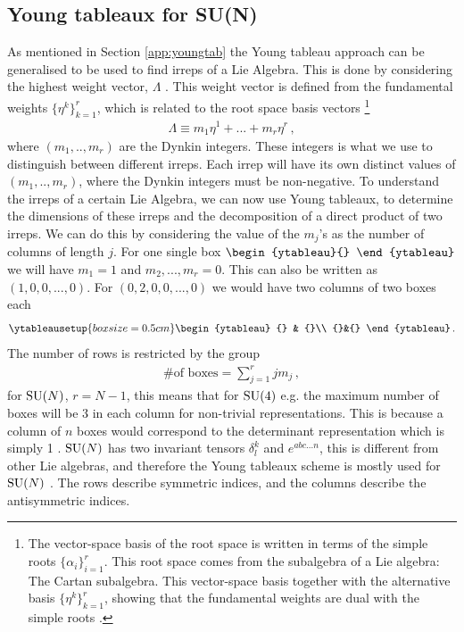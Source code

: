 \subsection{Young tableaux for SU(N)} \label{app:youngtabSUN}
As mentioned in Section \ref{app:youngtab} the Young tableau approach can be generalised to be used to find irreps of a Lie Algebra. This is done by considering the highest weight vector, $\Lambda$ \cite{Georgi:1999wka}. This weight vector is defined from the fundamental weights $\{\eta^k\}^r_{k=1}$, which is related to the root space basis vectors \footnote{The vector-space basis of the root space is written in terms of the simple roots $\{\alpha_i\}^r_{i=1}$. This root space comes from the subalgebra of a Lie algebra: The Cartan subalgebra. This vector-space basis together with the alternative basis $\{\eta^k\}^r_{k=1}$, showing that the fundamental weights are dual with the simple roots \cite{YoungTableaux}.}
\begin{align}
    \Lambda\equiv m_1\eta^1 +...+m_r\eta^r\,,
\end{align} 
where $(m_1,..,m_r)$ are the Dynkin integers. These integers is what we use to distinguish between different irreps. Each irrep will have its own distinct values of $(m_1,..,m_r)$, where the Dynkin integers must be non-negative. To understand the irreps of a certain Lie Algebra, we can now use Young tableaux, to determine the dimensions of these irreps and the decomposition of a direct product of two irreps. We can do this by considering the value of the $m_j$'s as the number of columns of length $j$. For one single box $\begin{ytableau}{} \end{ytableau}$ we will have $m_1=1$ and $m_2,...,m_r=0$. This can also be written as $(1,0,0,...,0)$. For $(0,2,0,0,...,0)$ we would have two columns of two boxes each \cite{YoungTableaux}
\begin{align}
    \ytableausetup{boxsize=0.5cm}
    \begin{ytableau}
        {} & {}\\ {}&{}
    \end{ytableau}\,.
\end{align}
The number of rows is restricted by the group
\begin{align}
    \text{\# of boxes} =\sum^r_{j=1}j m_j\,,
\end{align}
for $\mathrm{SU}(N)$, $r=N-1$, this means that for $\mathrm{SU}(4)$ e.g. the maximum number of boxes will be 3 in each column for non-trivial representations. This is because a column of $n$ boxes would correspond to the determinant representation which is simply 1 \cite{YoungTableaux}. $\mathrm{SU}(N)$ has two invariant tensors $\delta^k_l$ and $e^{abc...n}$, this is different from other Lie algebras, and therefore the Young tableaux scheme is mostly used for $\mathrm{SU}(N)$ \cite{YoungTableaux}. The rows describe symmetric indices, and the columns describe the antisymmetric indices.   

